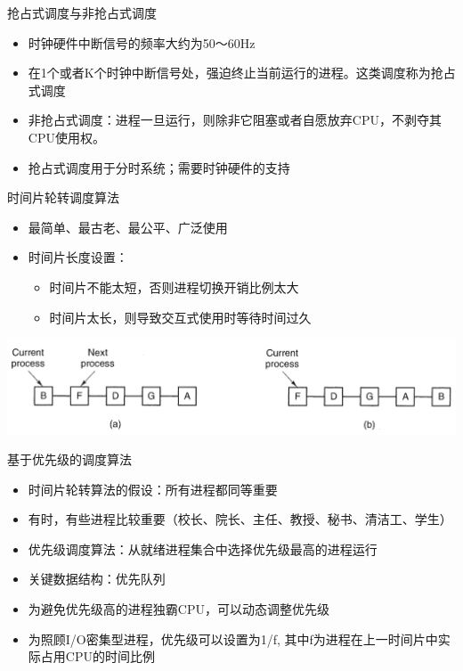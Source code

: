 \documentclass[xcolor=svgnames]{beamer}
\begin{document}
\begin{CJK*}{UTF8}{gbsn}
\begin{frame}{抢占式调度与非抢占式调度}
\begin{itemize}
\item 时钟硬件中断信号的频率大约为50～60Hz
\item 在1个或者K个时钟中断信号处，强迫终止当前运行的进程。这类调度称为抢占式调度
\item 非抢占式调度：进程一旦运行，则除非它阻塞或者自愿放弃CPU，不剥夺其CPU使用权。
\item 抢占式调度用于分时系统；需要\alert{时钟硬件}的支持
\end{itemize}
\end{frame}

\begin{frame}{时间片轮转调度算法}
\begin{itemize}
\item 最简单、最古老、最公平、广泛使用
\item 时间片长度设置：
\begin{itemize}
\item 时间片不能太短，否则进程切换开销比例太大
\item 时间片太长，则导致交互式使用时等待时间过久
\end{itemize}
\end{itemize}
\includegraphics[width=1.0\textwidth]{round.png}
\end{frame}

\begin{frame}{基于优先级的调度算法}
\begin{itemize}
\item 时间片轮转算法的假设：所有进程都同等重要
\item 有时，有些进程比较重要（校长、院长、主任、教授、秘书、清洁工、学生）
\item 优先级调度算法：从就绪进程集合中选择优先级最高的进程运行
\item 关键数据结构：\alert{优先队列}
\item 为避免优先级高的进程独霸CPU，可以动态调整优先级
\item 为照顾I/O密集型进程，优先级可以设置为1/f, 其中f为进程在上一时间片中实际占用CPU的时间比例
\end{itemize}
\end{frame}


\end{CJK*}
\end{document}
